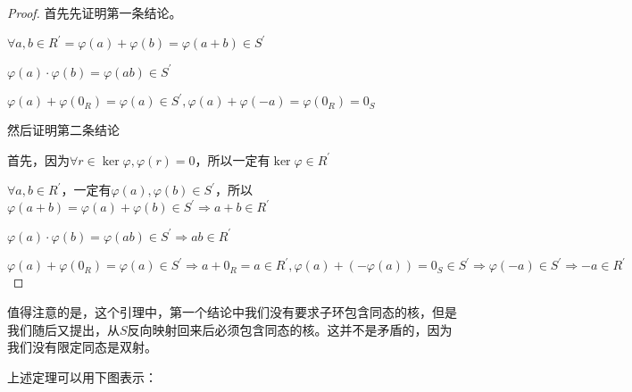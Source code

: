\documentclass[12pt, a4paper, oneside, UTF8]{ctexbook}
\begin{document}
			\begin{proof}
				首先先证明第一条结论。

				$\forall a,b \in R^{\prime}=\varphi (a)+\varphi (b)=\varphi (a+b)\in S^{\prime}$

				$\varphi (a)\cdot \varphi (b)=\varphi (ab) \in S^{\prime}$

				$\varphi (a) + \varphi (0_R) = \varphi (a) \in S^{\prime},\varphi (a)+\varphi (-a)=\varphi (0_R)=0_S$

				然后证明第二条结论

				首先，因为$\forall r \in \ker \varphi ,\varphi (r) = 0$，所以一定有$\ker \varphi \in R^{\prime}$

				$\forall a,b \in R^{\prime}$，一定有$\varphi (a),\varphi (b) \in S^{\prime}$，所以$\varphi (a+b)=\varphi (a)+\varphi (b) \in S^{\prime} \Rightarrow a+b \in R^{\prime}$

				$\varphi (a)\cdot \varphi (b)=\varphi (ab) \in S^{\prime} \Rightarrow ab \in R^{\prime}$

				$\varphi (a) + \varphi (0_R) = \varphi (a) \in S^{\prime} \Rightarrow a+0_R=a \in R^{\prime},\varphi (a)+\left(-\varphi (a)\right)=0_S \in S^{\prime}\Rightarrow \varphi (-a) \in S^{\prime} \Rightarrow -a \in R^{\prime}$
			\end{proof}
			值得注意的是，这个引理中，第一个结论中我们没有要求子环包含同态的核，但是我们随后又提出，从$S$反向映射回来后必须包含同态的核。这并不是矛盾的，因为我们没有限定同态是双射。

			上述定理可以用下图表示：
\end{document}
